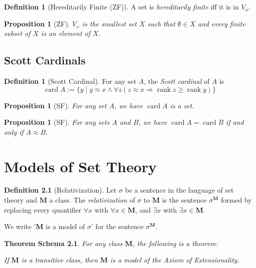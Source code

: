 \documentclass{book}
\newtheorem{prop}[ax]{Proposition}
\newtheorem{thms}[ax]{Theorem Schema}
\theoremstyle{definition}
\newtheorem{df}[ax]{Definition}
\newcommand{\rank}{\ensuremath{\operatorname{rank}}}
\newcommand{\card}{\ensuremath{\operatorname{card}}}
\begin{document}
\begin{df}[Hereditarily Finite (ZF)]
A set is \emph{hereditarily finite} iff it is in $V_\omega$.
\end{df}

\begin{prop}[ZF]
$V_\omega$ is the smallest set $X$ such that $\emptyset \in X$ and every finite subset of $X$ is an element of $X$.
\end{prop}

\section{Scott Cardinals}

\begin{df}[Scott Cardinal]
For any set $A$, the \emph{Scott cardinal} of $A$ is
\[ \card A := \{ y \mid y \approx x \wedge \forall z (z \approx x \Rightarrow \rank z \geq \rank y) \} \]
\end{df}

\begin{prop}[SF]
For any set $A$, we have $\card A$ is a set.
\end{prop}

\begin{prop}[SF]
For any sets $A$ and $B$, we have $\card A = \card B$ if and only if $A \approx B$.
\end{prop}

\chapter{Models of Set Theory}

\begin{df}[Relativization]
Let $\sigma$ be a sentence in the language of set theory and $\mathbf{M}$ a class. The \emph{relativization} of $\sigma$ to $\mathbf{M}$ is the sentence $\sigma^\mathbf{M}$ formed by replacing every quantifier $\forall x$ with $\forall x \in \mathbf{M}$, and $\exists x$ with $\exists x \in \mathbf{M}$.

We write '$\mathbf{M}$ is a model of $\sigma$' for the sentence $\sigma^\mathbf{M}$.
\end{df}

\begin{thms}
\label{thm:modelExtensionality}
For any class $\mathbf{M}$, the following is a theorem:

If $\mathbf{M}$ is a transitive class, then $\mathbf{M}$ is a model of the Axiom of Extensionality.
\end{thms}
\end{document}
